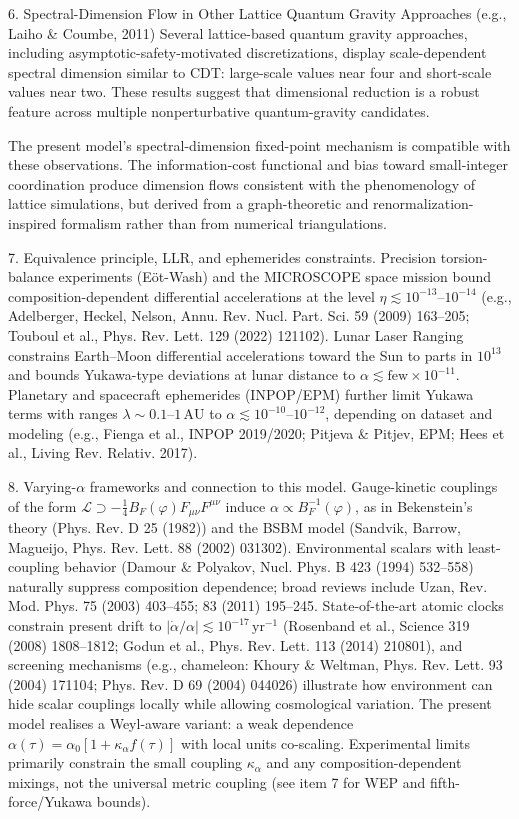 \documentclass[11pt]{article}
\begin{document}
6. Spectral-Dimension Flow in Other Lattice Quantum Gravity Approaches (e.g., Laiho \& Coumbe, 2011)
\quad Several lattice-based quantum gravity approaches, including asymptotic-safety-motivated discretizations, display scale-dependent spectral dimension similar to CDT: large-scale values near four and short-scale values near two. These results suggest that dimensional reduction is a robust feature across multiple nonperturbative quantum-gravity candidates.

The present model's spectral-dimension fixed-point mechanism is compatible with these observations. The information-cost functional and bias toward small-integer coordination produce dimension flows consistent with the phenomenology of lattice simulations, but derived from a graph-theoretic and renormalization-inspired formalism rather than from numerical triangulations.

7. Equivalence principle, LLR, and ephemerides constraints. \quad Precision torsion-balance experiments (E\"ot-Wash) and the MICROSCOPE space mission bound composition-dependent differential accelerations at the level $\eta\lesssim 10^{-13}$--$10^{-14}$ (e.g., Adelberger, Heckel, Nelson, Annu. Rev. Nucl. Part. Sci. 59 (2009) 163--205; Touboul et al., Phys. Rev. Lett. 129 (2022) 121102). Lunar Laser Ranging constrains Earth--Moon differential accelerations toward the Sun to parts in $10^{13}$ and bounds Yukawa-type deviations at lunar distance to $\alpha\lesssim \text{few}\times 10^{-11}$. Planetary and spacecraft ephemerides (INPOP/EPM) further limit Yukawa terms with ranges $\lambda\sim 0.1$--$1\,\text{AU}$ to $\alpha\lesssim 10^{-10}$--$10^{-12}$, depending on dataset and modeling (e.g., Fienga et al., INPOP 2019/2020; Pitjeva \& Pitjev, EPM; Hees et al., Living Rev. Relativ. 2017).

8. Varying-$\alpha$ frameworks and connection to this model. \quad Gauge-kinetic couplings of the form $\mathcal L\supset -\tfrac14 B_F(\varphi) F_{\mu\nu}F^{\mu\nu}$ induce $\alpha\propto B_F^{-1}(\varphi)$, as in Bekenstein's theory (Phys. Rev. D 25 (1982)) and the BSBM model (Sandvik, Barrow, Magueijo, Phys. Rev. Lett. 88 (2002) 031302). Environmental scalars with least-coupling behavior (Damour \& Polyakov, Nucl. Phys. B 423 (1994) 532--558) naturally suppress composition dependence; broad reviews include Uzan, Rev. Mod. Phys. 75 (2003) 403--455; 83 (2011) 195--245. State-of-the-art atomic clocks constrain present drift to $|\dot{\alpha}/\alpha|\lesssim 10^{-17}\,\text{yr}^{-1}$ (Rosenband et al., Science 319 (2008) 1808--1812; Godun et al., Phys. Rev. Lett. 113 (2014) 210801), and screening mechanisms (e.g., chameleon: Khoury \& Weltman, Phys. Rev. Lett. 93 (2004) 171104; Phys. Rev. D 69 (2004) 044026) illustrate how environment can hide scalar couplings locally while allowing cosmological variation. The present model realises a Weyl-aware variant: a weak dependence $\alpha(\tau)=\alpha_0[1+\kappa_\alpha f(\tau)]$ with local units co-scaling. Experimental limits primarily constrain the small coupling $\kappa_\alpha$ and any composition-dependent mixings, not the universal metric coupling (see item 7 for WEP and fifth-force/Yukawa bounds).
\end{document}
